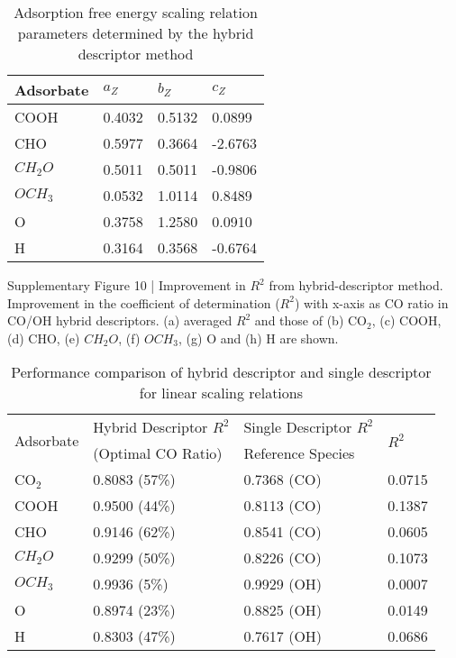 \begin{table}[h]
  \centering
  {\fontsize{10}{12}\selectfont
  \begin{tabular}{*{4}{l}}
    \hline
    \textbf{Adsorbate} & \textbf{$a_Z$}  & \textbf{$b_Z$}  & \textbf{$c_Z$}   \\
    \hline
    COOH      & 0.4032 & 0.5132 & 0.0899  \\
    CHO       & 0.5977 & 0.3664 & -2.6763 \\
    $CH_2O$   & 0.5011 & 0.5011 & -0.9806 \\
    $OCH_3$   & 0.0532 & 1.0114 & 0.8489  \\
    O         & 0.3758 & 1.2580 & 0.0910  \\
    H         & 0.3164 & 0.3568 & -0.6764 \\
    \hline
  \end{tabular}
  }
  \caption{Adsorption free energy scaling relation parameters determined by the hybrid descriptor method}
  \label{si_table13}
\end{table}


Supplementary Figure 10 | Improvement in $R^2$ from hybrid-descriptor method. Improvement in the coefficient of determination ($R^2$) with x-axis as CO ratio in CO/OH hybrid descriptors. (a) averaged $R^2$ and those of (b) CO$_2$, (c) COOH, (d) CHO, (e) $CH_2O$, (f) $OCH_3$, (g) O and (h) H are shown.

\begin{table}[h]
  \centering
  {\fontsize{10}{12}\selectfont
  \begin{tabular}{*{4}{l}}
    \hline
    \multirow{2}{*}{Adsorbate} & Hybrid Descriptor $R^2$ & Single Descriptor $R^2$ & \multirow{2}{*}{$R^2$} \\
                               & (Optimal CO Ratio)      & Reference Species       &                        \\
    \hline
    CO$_2$    & 0.8083 (57\%)  & 0.7368 (CO)  & 0.0715 \\
    COOH      & 0.9500 (44\%)  & 0.8113 (CO)  & 0.1387 \\
    CHO       & 0.9146 (62\%)  & 0.8541 (CO)  & 0.0605 \\
    $CH_2O$   & 0.9299 (50\%)  & 0.8226 (CO)  & 0.1073 \\
    $OCH_3$   & 0.9936 (5\%)   & 0.9929 (OH)  & 0.0007 \\
    O         & 0.8974 (23\%)  & 0.8825 (OH)  & 0.0149 \\
    H         & 0.8303 (47\%)  & 0.7617 (OH)  & 0.0686 \\
    \hline
  \end{tabular}
  }
  \caption{Performance comparison of hybrid descriptor and single descriptor for linear scaling relations}
  \label{si_table14}
\end{table}


